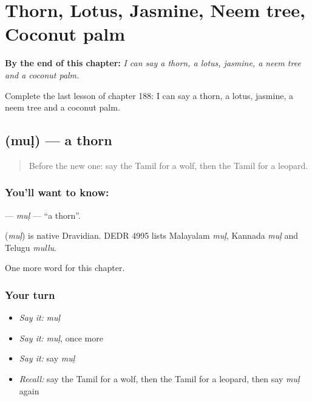 
\chapter{Thorn, Lotus, Jasmine, Neem tree, Coconut palm}
\label{ch:ta-thorn-lotus-jasmine-neem-tree-coconut-palm}

\begin{chapteropening}
\textbf{By the end of this chapter:} \emph{I can say a thorn, a lotus, jasmine, a neem tree and a coconut palm.}

Complete the last lesson of chapter 188: I can say a thorn, a lotus, jasmine, a neem tree and a coconut palm.
\end{chapteropening}

\section[\texorpdfstring{\ta{முள்} (muḷ)}{முள் (muḷ)}]{ (muḷ) — a thorn}

\label{lesson:TA-C188-mul}



\begin{quote}
Before the new one: say the Tamil for a wolf, then the Tamil for a leopard.
\end{quote}

\subsection*{You'll want to know: }
\textbf{} — \emph{muḷ} — \textquotedblleft{}a thorn\textquotedblright{}.

\begin{cousinweb}
\textbf{} (\emph{muḷ}) is native Dravidian. DEDR 4995 lists Malayalam \emph{muḷ}, Kannada \emph{muḷ} and Telugu \emph{mullu}.
\end{cousinweb}

\begin{grammarlens}[title={What you've built}]
One more word for this chapter.
\end{grammarlens}

\subsection*{Your turn}
\begin{itemize}
\raggedright
  \item \emph{Say it:} \emph{muḷ}
  \item \emph{Say it:} \emph{muḷ}, once more
  \item \emph{Say it:} say \emph{muḷ}
  \item \emph{Recall:} say the Tamil for a wolf, then the Tamil for a leopard, then say \emph{muḷ} again
\end{itemize}

